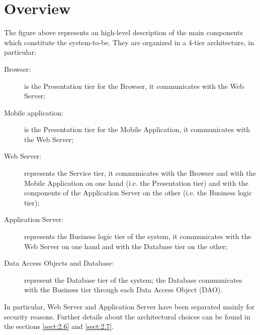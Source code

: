 \documentclass[../../DD.tex]{subfiles}
\begin{document}
\section{Overview\label{sect:2.1}}


The figure above represents an high-level description of the main components which constitute the system-to-be. They are organized in a 4-tier architecture, in particular:
\begin{description}
	\item [Browser:] is the Presentation tier for the  Browser, it communicates with the Web Server;
	\item [Mobile application:] is the Presentation tier for the  Mobile Application, it communicates with the Web Server;
	\item [Web Server:] represents the Service tier, it communicates with the  Browser and with the Mobile Application on one hand (i.e. the Presentation tier) and with the components of the Application Server on the other (i.e. the Business logic tier);
	\item [Application Server:] represents the Business logic tier of the system, it communicates with the Web Server on one hand and with the Database tier on the other; 
	\item [Data Access Objects and Database:] represent the Database tier of the system; the Database communicates with the Business tier through each Data Access Object (DAO).
\end{description}
In particular, Web Server and Application Server have been separated mainly for security reasons.
Further details about the architectural choices can be found in the sections \ref{sect:2.6} and \ref{sect:2.7}.
\newpage
\end{document}
